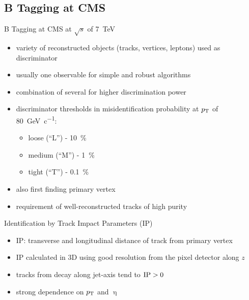 \subsection{B Tagging at CMS}
\begin{frame}{B Tagging at CMS at $\sqrt{s}$ of \SI{7}{\tera\electronvolt}}
	
	\begin{itemize}\itemfill
		\item variety of reconstructed objects (tracks, vertices, leptons) used as discriminator
		\item usually one observable for simple and robust algorithms 
		\item combination of several for higher discrimination power
		\item discriminator thresholds in misidentification probability at $p_{\text{T}}$ of \SI{80}{\giga\electronvolt\per c}:
		\begin{itemize}
			\item loose (``L'') - \SI{10}{\%}
			\item medium (``M'') - \SI{1}{\%}
			\item tight (``T'') - \SI{.1}{\%}
		\end{itemize}
		\item also first finding primary vertex 
		\item requirement of well-reconstructed tracks of high purity
	\end{itemize}

\end{frame}
\begin{frame}{Identification by Track Impact Parameters (IP)}

	\begin{minipage}[c][.4\textheight]{.6\textwidth}
		\begin{itemize}\itemfill
		\item IP: transverse and longitudinal distance of track from primary vertex
		\item IP calculated in 3D using good resolution from the pixel detector along $z$
		\item tracks from decay along jet-axis \ra tend to $\text{IP}>0$
		\item strong dependence on $p_{\text{T}}$ and $\upeta$
		\end{itemize}
	\end{minipage}
	\begin{minipage}{.38\textwidth}
	\end{minipage}
	

\end{frame}
